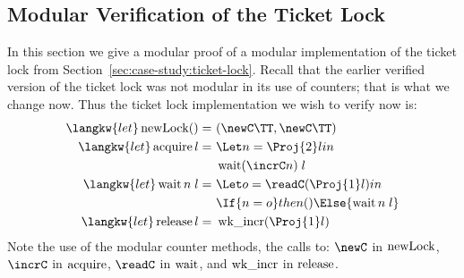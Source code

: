 \subsection{Modular Verification of the Ticket Lock}
\label{sec:modular-verification-of-ticket-lock}
In this section we give a modular proof of a modular implementation of the ticket lock
from Section~\ref{sec:case-study:ticket-lock}. Recall that the earlier verified version of the ticket
lock was not modular in its use of counters; that is what we change now. Thus the ticket
lock implementation we wish to verify now is:
\begin{align*}
    \langkw{let} \newLock () =\ &(\newC\TT, \newC\TT)\\
    \langkw{let} \acquire l =\ &\Let n = \Proj{2} l in\\
                             &\wait (\incrC n)\; l\\
    \langkw{let} \wait n \; l =\ &\Let o = \readC (\Proj{1} l) in \\
                             &\If{n = o}then{()}\Else{\wait n\; l}\\
    \langkw{let} \release l =\ &\wkincrC (\Proj{1} l)
\end{align*}
Note the use of the modular counter methods, the calls to: $\newC$ in $\operatorname{newLock}$, $\incrC$ in $\operatorname{acquire}$, $\readC$ in $\operatorname{wait}$, and $\operatorname{wk{\_}incr}$ in $\operatorname{release}$.
  
